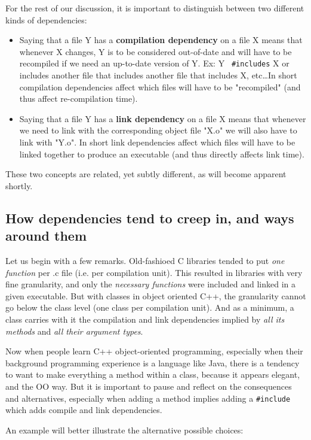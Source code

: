 \documentclass[11pt]{book}
\begin{document}
For the rest of our discussion, it is important to distinguish between two
different kinds of dependencies:
\begin{itemize}
\item Saying that a file Y has a {\bf compilation dependency} on a file X
  means that whenever X changes, Y is to be considered out-of-date and will
  have to be recompiled if we need an up-to-date version of Y. Ex: Y {\tt
  \#includes} X or includes another file that includes another file that
  includes X, etc\ldots In short compilation dependencies affect which files
  will have to be "recompiled" (and thus affect re-compilation time).
\item Saying that a file Y has a {\bf link dependency} on a
  file X means that whenever we need to link with the corresponding object
  file "X.o" we will also have to link with "Y.o". In short link
  dependencies affect which files will have to be linked together to
  produce an executable (and thus directly affects link time).
\end{itemize}

These two concepts are related, yet subtly different, as will become
apparent shortly.

\subsection{How dependencies tend to creep in, and ways around them}

Let us begin with a few remarks. Old-fashioed C libraries tended to put
{\em one function} per .c file (i.e. per compilation unit). This resulted
in libraries with very fine granularity, and only the {\em necessary
functions} were included and linked in a given executable. But with classes
in object oriented C++, the granularity cannot go below the class level
(one class per compilation unit). And as a minimum, a class carries with it 
the compilation and link dependencies implied by {\em all its
 methods} and {\em all their argument types}.

Now when people learn C++ object-oriented programming, especially when
their background programming experience is a language like Java, there is a
tendency to want to make everything a method within a class, because it
appears elegant, and the OO way. But it is important to pause and reflect
on the consequences and alternatives, especially when adding a method
implies adding a {\tt \#include} which adds compile and link dependencies.

An example will better illustrate the alternative possible choices:
\end{document}
